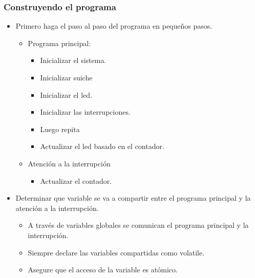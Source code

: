 \documentclass[10.5pt,scale=1.0,t,aspectratio=169,hyperref={pdfpagelabels=false}]{beamer}
\begin{document}
\begin{frame}
	\frametitle{Construyendo el programa}
	\begin{itemize}
		\item Primero haga el paso al paso del programa en pequeños pasos.
		\begin{itemize}
			\item Programa principal:
			\begin{itemize}
				\item Inicializar el sistema.
				\item Inicializar suiche
				\item Inicializar el led.
				\item Inicializar las interrupciones.
				\item Luego repita
				\item Actualizar el led basado en el contador. 
			\end{itemize}
			\item Atención a la interrupción
			\begin{itemize}
				\item Actualizar el contador. 
			\end{itemize}
		\end{itemize}
		\item Determinar que variable se va a compartir entre el programa principal y la atención a la interrupción.
		\begin{itemize}
			\item A través de variables globales se comunican el programa principal y la interrupción.
			\item Siempre declare las variables compartidas como volatile.
			\item Asegure que el acceso de la variable es atómico. 
		\end{itemize}
	\end{itemize}
\end{frame}
\end{document}
